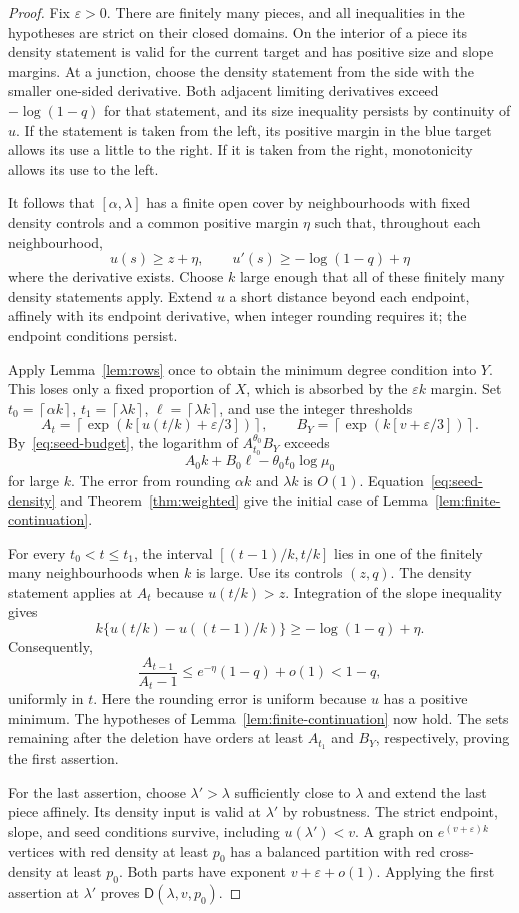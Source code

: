 \documentclass[11pt]{article}
\theoremstyle{definition}
\theoremstyle{remark}
\newcommand{\D}{\mathsf D}
\newcommand{\ceil}[1]{\left\lceil #1\right\rceil}
\numberwithin{equation}{section}
\begin{document}
\begin{proof}
Fix $\varepsilon>0$. There are finitely many pieces, and all inequalities in the hypotheses are strict on their closed domains. On the interior of a piece its density statement is valid for the current target and has positive size and slope margins. At a junction, choose the density statement from the side with the
smaller one-sided derivative. Both adjacent limiting derivatives exceed
$-\log(1-q)$ for that statement, and its size inequality persists by
continuity of $u$. If the statement is taken from the left, its positive
margin in the blue target allows its use a little to the right. If it
is taken from the right, monotonicity allows its use to the left.

It follows that $[\alpha,\lambda]$ has a finite open cover by neighbourhoods with fixed density controls and a common positive margin $\eta$ such that, throughout each neighbourhood,
\[
 u(s)\ge z+\eta,\qquad u'(s)\ge-\log(1-q)+\eta
\]
where the derivative exists. Choose $k$ large enough that all of these finitely many density
statements apply. Extend $u$ a short distance beyond each endpoint, affinely with its endpoint derivative, when integer rounding requires it; the endpoint conditions persist.

Apply Lemma~\ref{lem:rows} once to obtain the minimum degree condition
into $Y$. This loses only a fixed proportion of $X$, which is absorbed
by the $\varepsilon k$ margin. Set $t_0=\ceil{\alpha k}$, $t_1=\ceil{\lambda k}$, $\ell=\ceil{\lambda k}$, and use the integer thresholds
\[
 A_t=\ceil{\exp(k[u(t/k)+\varepsilon/3])},\qquad
 B_Y=\ceil{\exp(k[v+\varepsilon/3])}.
\]
By~\eqref{eq:seed-budget}, the logarithm of $A_{t_0}^{\theta_0}B_Y$ exceeds
\[
 A_0k+B_0\ell-\theta_0t_0\log\mu_0
\]
for large $k$. The error from rounding $\alpha k$ and $\lambda k$ is $O(1)$. Equation~\eqref{eq:seed-density} and Theorem~\ref{thm:weighted} give
the initial case of Lemma~\ref{lem:finite-continuation}.

For every $t_0<t\le t_1$, the interval $[(t-1)/k,t/k]$ lies in one of the finitely many neighbourhoods when $k$ is large. Use its controls $(z,q)$. The density statement applies at $A_t$ because $u(t/k)>z$. Integration of the slope inequality gives
\[
 k\{u(t/k)-u((t-1)/k)\}\ge-\log(1-q)+\eta.
\]
Consequently,
\[
 \frac{A_{t-1}}{A_t-1}\le e^{-\eta}(1-q)+o(1)<1-q,
\]
uniformly in $t$. Here the rounding error is uniform because $u$ has a positive minimum. The hypotheses of Lemma~\ref{lem:finite-continuation} now hold. The
sets remaining after the deletion have orders at least $A_{t_1}$ and
$B_Y$, respectively, proving the first assertion.

For the last assertion, choose $\lambda'>\lambda$ sufficiently close to $\lambda$ and extend the last piece affinely. Its density input is valid at $\lambda'$ by robustness. The strict endpoint, slope, and seed conditions survive, including $u(\lambda')<v$. A graph on $e^{(v+\varepsilon)k}$ vertices with red density at least
$p_0$ has a balanced partition with red cross-density at least $p_0$.
Both parts have exponent $v+\varepsilon+o(1)$. Applying the first assertion at $\lambda'$ proves $\D(\lambda,v,p_0)$.
\end{proof}
\end{document}
